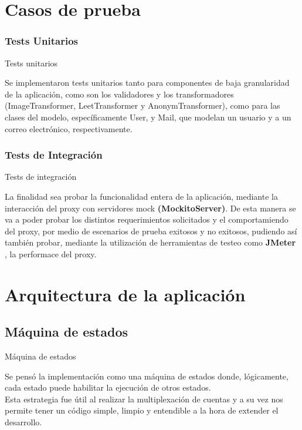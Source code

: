 \documentclass{beamer}
\begin{document}
\section{Casos de prueba}

\subsubsection{Tests Unitarios}
\begin{frame}{Tests unitarios}
\par    Se implementaron tests unitarios tanto para componentes de baja granularidad de la aplicación, como son los validadores y los transformadores (ImageTransformer, LeetTransformer y AnonymTransformer), como para las clases del modelo, específicamente User, y Mail, que modelan un usuario y a un correo electrónico, respectivamente. 
\end{frame}

\subsubsection{Tests de Integración}
\begin{frame}{Tests de integración}
\par	La finalidad sea probar la funcionalidad entera de la aplicación, mediante la interacción del proxy con servidores mock \textbf{(MockitoServer)}. De esta manera se va a poder probar los distintos requerimientos solicitados y el comportamiendo del proxy, por medio de escenarios de prueba exitosos y no exitosos, pudiendo así también probar, mediante la utilización de herramientas de testeo como \textbf{JMeter} , la performace del proxy.
\end{frame}

\section{Arquitectura de la aplicación}

\subsection{Máquina de estados}
\begin{frame}{Máquina de estados}
\par Se pensó la implementación como una máquina de estados donde, lógicamente, cada estado puede habilitar la ejecución de otros estados.\\[0.5cm]
Esta estrategia fue útil al realizar la multiplexación de cuentas y a su vez nos permite tener un código simple, limpio y entendible a la hora de extender el desarrollo.
\end{frame}
\end{document}
